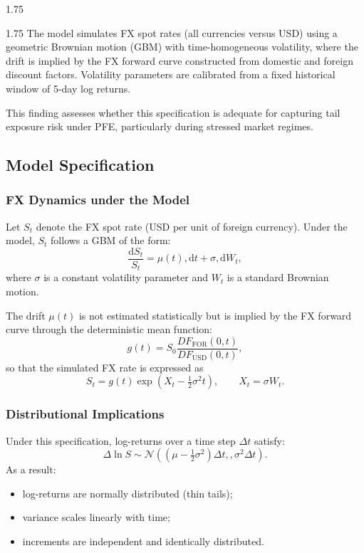 \begin{spacing}{1.75}
\begin{spacing}{1.75}
		The model simulates FX spot rates (all currencies versus USD) using a geometric Brownian motion (GBM) with time-homogeneous volatility, where the drift is implied by the FX forward curve constructed from domestic and foreign discount factors. Volatility parameters are calibrated from a fixed historical window of 5-day log returns.
		
		This finding assesses whether this specification is adequate for capturing tail exposure risk under PFE, particularly during stressed market regimes.
		
		\subsection{Model Specification}
		
		\subsubsection{FX Dynamics under the Model}
		Let $S_t$ denote the FX spot rate (USD per unit of foreign currency). Under the model, $S_t$ follows a GBM of the form:
		\begin{equation}
			\frac{\mathrm{d}S_t}{S_t} = \mu(t),\mathrm{d}t + \sigma,\mathrm{d}W_t,
		\end{equation}
		where $\sigma$ is a constant volatility parameter and $W_t$ is a standard Brownian motion.
		
		The drift $\mu(t)$ is not estimated statistically but is implied by the FX forward curve through the deterministic mean function:
		\begin{equation}
			g(t) = S_0\frac{DF_{\text{FOR}}(0,t)}{DF_{\text{USD}}(0,t)},
		\end{equation}
		so that the simulated FX rate is expressed as
		\begin{equation}
			S_t = g(t)\exp\left(X_t - \tfrac{1}{2}\sigma^2 t\right), \qquad X_t = \sigma W_t.
		\end{equation}
		
		\subsubsection{Distributional Implications}
		Under this specification, log-returns over a time step $\Delta t$ satisfy:
		\begin{equation}
			\Delta \ln S \sim \mathcal{N}\left((\mu-\tfrac{1}{2}\sigma^2)\Delta t,, \sigma^2\Delta t\right).
		\end{equation}
		As a result:
		\begin{itemize}
			\item log-returns are normally distributed (thin tails);
			\item variance scales linearly with time;
			\item increments are independent and identically distributed.
		\end{itemize}
		

\end{spacing}
\end{spacing}
